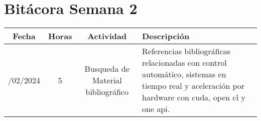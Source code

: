 \documentclass{article}
\begin{document}
\newpage
\section*{Bitácora Semana 2}

\begin{longtable}[c]{|c|c|c|p{6cm}|}
    \hline
    \textbf{Fecha} & \textbf{Horas} & \textbf{Actividad} & \textbf{Descripción} \\
    \hline
    \endhead
    \hline
    \endfoot
    13/02/2024 & 5 & Busqueda de Material bibliográfico &  Referencias bibliográficas relacionadas con control automático, sistemas en tiempo real y aceleración por hardware con cuda, open cl y one api. \\
    \hline
\end{longtable}
    




%
%
%
%
%
%
%
%
%
%
%
%
%
%
%

%
    
\end{document}
